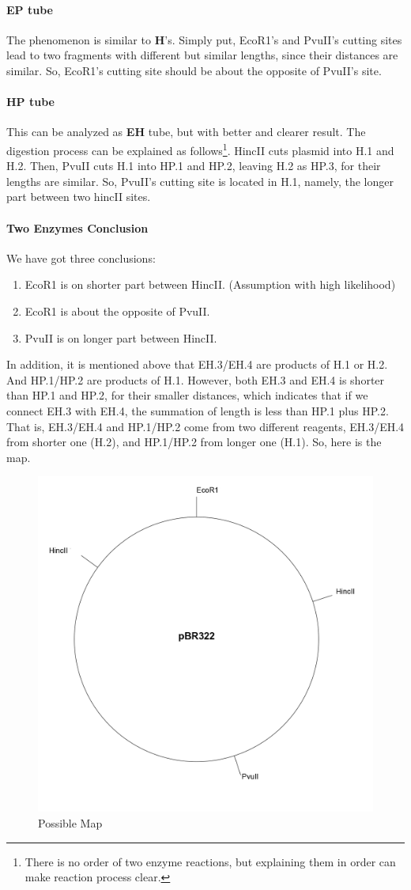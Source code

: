 \documentclass{article}
\begin{document}
                \paragraph{\textbf{EP} tube} The phenomenon is similar to \textbf{H}'s. Simply put, EcoR1's and PvuII's cutting sites lead to two fragments with different but similar lengths, since their distances are similar. So, EcoR1's cutting site should be about the opposite of PvuII's site.

                \paragraph{\textbf{HP} tube} This can be analyzed as \textbf{EH} tube, but with better and clearer result. The digestion process can be explained as follows\footnote{There is no order of two enzyme reactions, but explaining them in order can make reaction process clear.}. HincII cuts plasmid into H.1 and H.2. Then, PvuII cuts H.1 into HP.1 and HP.2, leaving H.2 as HP.3, for their lengths are similar. So, PvuII's cutting site is located in H.1, namely, the longer part between two hincII sites.

                \paragraph{Two Enzymes Conclusion} We have got three conclusions:
                    \begin{enumerate}
                        \item EcoR1 is on shorter part between HincII. (Assumption with high likelihood)
                        \item EcoR1 is about the opposite of PvuII.
                        \item PvuII is on longer part between HincII.
                    \end{enumerate}
                In addition, it is mentioned above that EH.3/EH.4 are products of H.1 or H.2. And HP.1/HP.2 are products of H.1. However, both EH.3 and EH.4 is shorter than HP.1 and HP.2, for their smaller distances, which indicates that if we connect EH.3 with EH.4, the summation of length is less than HP.1 plus HP.2. That is, EH.3/EH.4 and HP.1/HP.2 come from two different reagents, EH.3/EH.4 from shorter one (H.2), and HP.1/HP.2 from longer one (H.1). So, here is the map.
                \begin{figure}[H]
                    \centering
                    \includegraphics[width = 0.4\linewidth]{../Data/Plasmid/III.png}
                    \caption{Possible Map}
                    \label{possible.map}
                \end{figure}
\end{document}
